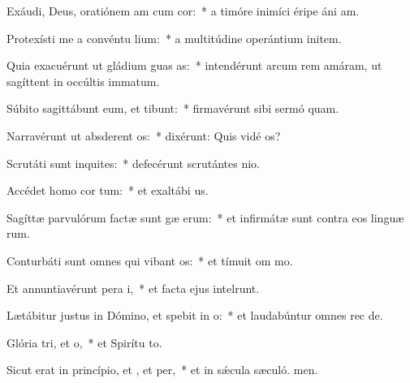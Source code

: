 \item Exáudi, Deus, oratiónem am cum cor:~* a timóre inimíci éripe áni am.
\item Protexísti me a convéntu lium:~* a multitúdine operántium initem.
\item Quia exacuérunt ut gládium guas as:~* intendérunt arcum rem amáram, ut sagíttent in occúltis immatum.
\item Súbito sagittábunt eum, et  tibunt:~* firmavérunt sibi sermó quam.
\item Narravérunt ut absderent os:~* dixérunt: Quis vidé os?
\item Scrutáti sunt inquites:~* defecérunt scrutántes nio.
\item Accédet homo  cor tum:~* et exaltábi us.
\item Sagíttæ parvulórum factæ sunt gæ erum:~* et infirmátæ sunt contra eos linguæ rum.
\item Conturbáti sunt omnes qui vibant os:~* et tímuit om mo.
\item Et annuntiavérunt pera i,~* et facta ejus intelrunt.
\item Lætábitur justus in Dómino, et spebit in o:~* et laudabúntur omnes rec de.
\item Glória tri, et o,~* et Spirítu to.
\item Sicut erat in princípio, et , et per,~* et in sǽcula sæculó. men.
